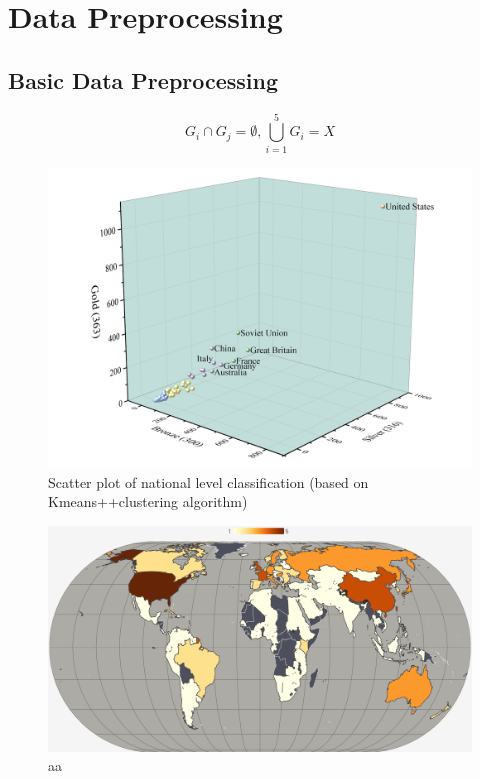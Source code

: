 \documentclass[12pt]{article}  %
\begin{document}
\section{Data Preprocessing}
\subsection{Basic Data Preprocessing}

$$G_{i} \cap G_{j}=\emptyset, \bigcup_{i=1}^{5} G_{i}=X$$


\begin{figure}[htbp]
	\centering
	\includegraphics[width=12cm]{img/Level1.png}
	\caption{Scatter plot of national level classification (based on Kmeans++clustering algorithm)}
	\label{fig:aa}
\end{figure}

\begin{figure}[htbp]
	\centering
	\includegraphics[width=12cm]{img/Level2.png}
	\caption{aa}
	\label{fig:aa}
\end{figure}
\end{document}
